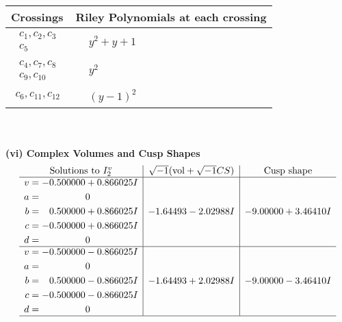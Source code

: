 \documentclass[1p]{elsarticle_modified}
\theoremstyle{definition}
\newcommand{\I}{\sqrt{-1}}
\begin{document}
\begin{tabular}{m{50pt}|m{274pt}}
Crossings & \hspace{64pt}Riley Polynomials at each crossing \\
\hline $$\begin{aligned}c_{1},c_{2},c_{3}\\c_{5}\end{aligned}$$&$\begin{aligned}
&y^2+y+1
\end{aligned}$\\
\hline $$\begin{aligned}c_{4},c_{7},c_{8}\\c_{9},c_{10}\end{aligned}$$&$\begin{aligned}
&y^2
\end{aligned}$\\
\hline $$\begin{aligned}c_{6},c_{11},c_{12}\end{aligned}$$&$\begin{aligned}
&(y-1)^2
\end{aligned}$\\
\hline
\end{tabular}\\~\\
\newpage\flushleft \textbf{(vi) Complex Volumes and Cusp Shapes}
$$\begin{array}{c|c|c}  
\text{Solutions to }I^v_{2}& \I (\text{vol} + \sqrt{-1}CS) & \text{Cusp shape}\\
 \hline 
\begin{aligned}
v &= -0.500000 + 0.866025 I \\
a &= \phantom{-0.000000 } 0 \\
b &= \phantom{-}0.500000 + 0.866025 I \\
c &= -0.500000 + 0.866025 I \\
d &= \phantom{-0.000000 } 0\end{aligned}
 & -1.64493 - 2.02988 I & -9.00000 + 3.46410 I \\ \hline\begin{aligned}
v &= -0.500000 - 0.866025 I \\
a &= \phantom{-0.000000 } 0 \\
b &= \phantom{-}0.500000 - 0.866025 I \\
c &= -0.500000 - 0.866025 I \\
d &= \phantom{-0.000000 } 0\end{aligned}
 & -1.64493 + 2.02988 I & -9.00000 - 3.46410 I\\
 \hline 
 \end{array}$$\newpage\newpage\renewcommand{\arraystretch}{1}
\end{document}

